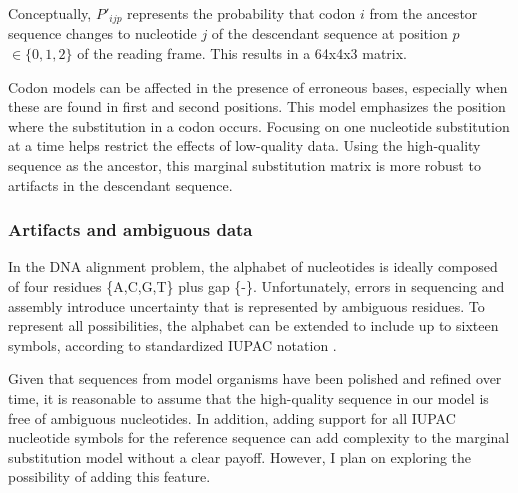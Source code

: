Conceptually, $P'_{ijp}$ represents the probability that codon $i$ from the
ancestor sequence changes to nucleotide $j$ of the descendant sequence at
position $p$ $\in \{0,1,2\}$ of the reading frame.
This results in a 64x4x3 matrix.

Codon models can be affected in the presence of erroneous bases, especially when these are found in first and second positions.
This model emphasizes the position where the substitution in a codon occurs.
Focusing on one nucleotide substitution at a time helps restrict the effects of
low-quality data.
Using the high-quality sequence as the ancestor, this marginal substitution
matrix is more robust to artifacts in the descendant sequence.


\subsubsection{Artifacts and ambiguous data}



In the DNA alignment problem, the alphabet of nucleotides is ideally composed
of four residues \{A,C,G,T\} plus gap \{-\}.
Unfortunately, errors in sequencing and assembly introduce uncertainty that is
represented by ambiguous residues.
To represent all possibilities, the alphabet can be extended to include up to
sixteen symbols, according to standardized IUPAC notation
\parencite{cornish_1985_nomenclature}.


Given that sequences from model organisms have been polished and refined over
time, it is reasonable to assume that the high-quality sequence in our model is
free of ambiguous nucleotides.
In addition, adding support for all IUPAC nucleotide symbols for the reference
sequence can add complexity to the marginal substitution model without a clear
payoff.
However, I plan on exploring the possibility of adding this feature.


